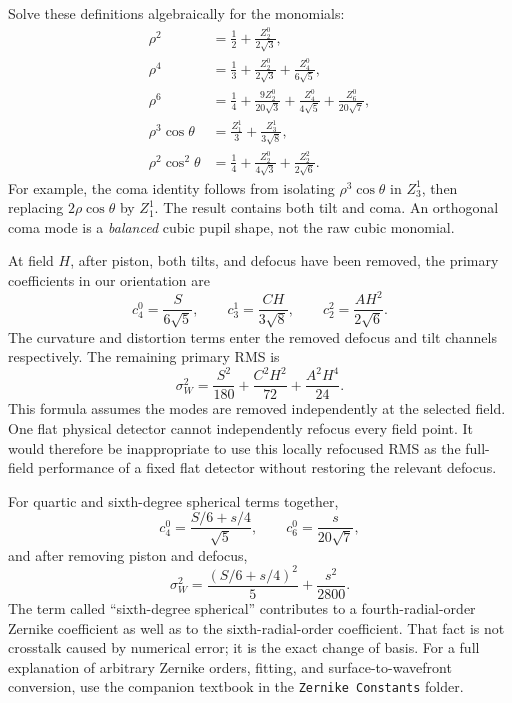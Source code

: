 Solve these definitions algebraically for the monomials:
\begin{align}
 \rho^2&=\frac12+\frac{Z_2^0}{2\sqrt3},\\
 \rho^4&=\frac13+\frac{Z_2^0}{2\sqrt3}
                        +\frac{Z_4^0}{6\sqrt5},\\
 \rho^6&=\frac14+\frac{9Z_2^0}{20\sqrt3}
                   +\frac{Z_4^0}{4\sqrt5}+\frac{Z_6^0}{20\sqrt7},\\
 \rho^3\cos\theta&=\frac{Z_1^1}{3}+\frac{Z_3^1}{3\sqrt8},\\
 \rho^2\cos^2\theta&=\frac14+\frac{Z_2^0}{4\sqrt3}
                                      +\frac{Z_2^2}{2\sqrt6}.
 \label{ab:monomialZ}
\end{align}
For example, the coma identity follows from isolating $\rho^3\cos\theta$
in $Z_3^1$, then replacing $2\rho\cos\theta$ by $Z_1^1$. The result
contains both tilt and coma. An orthogonal coma mode is a \emph{balanced}
cubic pupil shape, not the raw cubic monomial.

At field $H$, after piston, both tilts, and defocus have been removed, the
primary coefficients in our orientation are
\begin{equation}
 c_4^0=\frac{S}{6\sqrt5},\qquad
 c_3^1=\frac{CH}{3\sqrt8},\qquad
 c_2^2=\frac{AH^2}{2\sqrt6}.
\end{equation}
The curvature and distortion terms enter the removed defocus and tilt
channels respectively. The remaining primary RMS is
\begin{equation}
 \boxed{\sigma_W^2=\frac{S^2}{180}
                  +\frac{C^2H^2}{72}
                  +\frac{A^2H^4}{24}.}
 \label{ab:primaryRMS}
\end{equation}
This formula assumes the modes are removed independently at the selected
field. One flat physical detector cannot independently refocus every field
point. It would therefore be inappropriate to use this locally refocused
RMS as the full-field performance of a fixed flat detector without restoring
the relevant defocus.

For quartic and sixth-degree spherical terms together,
\begin{equation}
 c_4^0=\frac{S/6+s/4}{\sqrt5},\qquad
 c_6^0=\frac{s}{20\sqrt7},
\end{equation}
and after removing piston and defocus,
\begin{equation}
 \sigma_W^2=\frac{(S/6+s/4)^2}{5}+\frac{s^2}{2800}.
\end{equation}
The term called ``sixth-degree spherical'' contributes to a fourth-radial-order
Zernike coefficient as well as to the sixth-radial-order coefficient. That
fact is not crosstalk caused by numerical error; it is the exact change of
basis. For a full explanation of arbitrary Zernike orders, fitting, and
surface-to-wavefront conversion, use the companion textbook in the
\texttt{Zernike Constants} folder.

